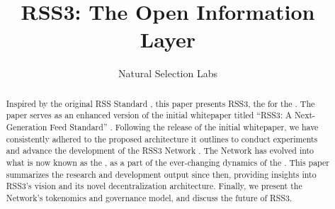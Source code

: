 \documentclass[final]{IEEEtran}
\begin{document}
\title{RSS3: The Open Information Layer}

\author{Natural Selection Labs}
\maketitle


\thispagestyle{plain}
\pagestyle{plain}

\begin{abstract}

    Inspired by the original RSS Standard \cite{rssadvisoryboard2009RSS}, this paper presents RSS3, the  for the . The paper serves as an enhanced version of the initial whitepaper titled ``RSS3: A Next-Generation Feed Standard'' \cite{whitepaper}. Following the release of the initial whitepaper, we have consistently adhered to the proposed architecture it outlines to conduct experiments and advance the development of the RSS3 Network \cite{dsl0.2,dsl0.3,dsl0.4}. The Network has evolved into what is now known as the , as a part of the ever-changing dynamics of the . This paper summarizes the research and development output since then, providing insights into RSS3's vision and its novel decentralization architecture. Finally, we present the Network's tokenomics and governance model, and discuss the future of RSS3.

\end{abstract}
















\cleardoublepage

\printglossary[title=Glossary, toctitle=Glossary]
\end{document}
